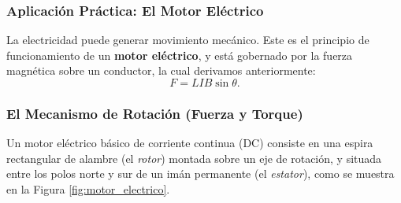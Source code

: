 \documentclass[11pt,a4paper]{book}
\begin{document}
\subsubsection{Aplicación Práctica: El Motor Eléctrico}

La electricidad puede generar movimiento mecánico. Este es el principio de funcionamiento de un \textbf{motor eléctrico}, y está gobernado por la fuerza magnética sobre un conductor, la cual derivamos anteriormente:
\begin{equation}
    F = L I B \sin\theta.
\end{equation}

\subsubsection{El Mecanismo de Rotación (Fuerza y Torque)}

Un motor eléctrico básico de corriente continua (DC) consiste en una espira rectangular de alambre (el \textit{rotor}) montada sobre un eje de rotación, y situada entre los polos norte y sur de un imán permanente (el \textit{estator}), como se muestra en la Figura \ref{fig:motor_electrico}.
\end{document}
